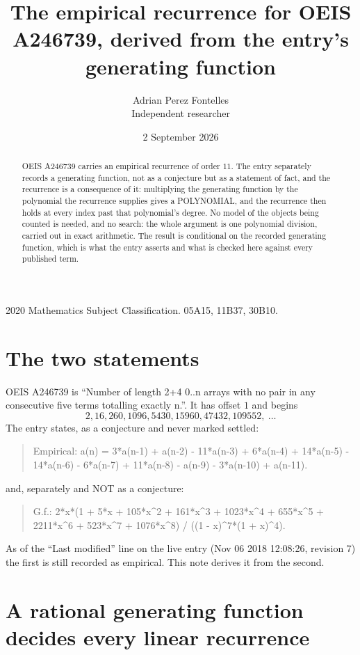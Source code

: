 \documentclass[11pt,a4paper]{article}
\title{The empirical recurrence for OEIS A246739, derived from the entry's generating function}
\author{Adrian Perez Fontelles\\ \small Independent researcher}
\date{2 September 2026}
\theoremstyle{plain}
\theoremstyle{definition}
\begin{document}
\maketitle

\begin{abstract}
OEIS A246739 carries an empirical recurrence of order $11$. The entry separately records a
generating function, not as a conjecture but as a statement of fact, and the recurrence is a
consequence of it: multiplying the generating function by the polynomial the recurrence
supplies gives a POLYNOMIAL, and the recurrence then holds at every index past that
polynomial's degree. No model of the objects being counted is needed, and no search: the
whole argument is one polynomial division, carried out in exact arithmetic. The result is
conditional on the recorded generating function, which is what the entry asserts and what is
checked here against every published term.
\end{abstract}

\noindent\small 2020 Mathematics Subject Classification. 05A15, 11B37, 30B10.\normalsize

\section{The two statements}

OEIS A246739 is ``Number of length 2+4 0..n arrays with no pair in any consecutive five terms totalling exactly n.''. It has offset $1$ and begins
\[
2, 16, 260, 1096, 5430, 15960, 47432, 109552,\ \dots
\]
The entry states, as a conjecture and never marked settled:
\begin{quote}
Empirical: a(n) = 3*a(n-1) + a(n-2) - 11*a(n-3) + 6*a(n-4) + 14*a(n-5) - 14*a(n-6) - 6*a(n-7) + 11*a(n-8) - a(n-9) - 3*a(n-10) + a(n-11).
\end{quote}
and, separately and NOT as a conjecture:
\begin{quote}
G.f.: 2*x*(1 + 5*x + 105*x\^{}2 + 161*x\^{}3 + 1023*x\^{}4 + 655*x\^{}5 + 2211*x\^{}6 + 523*x\^{}7 + 1076*x\^{}8) / ((1 - x)\^{}7*(1 + x)\^{}4).
\end{quote}
As of the ``Last modified'' line on the live entry (Nov 06 2018 12:08:26, revision 7) the first is still
recorded as empirical. This note derives it from the second.

\section{A rational generating function decides every linear recurrence}
\end{document}
